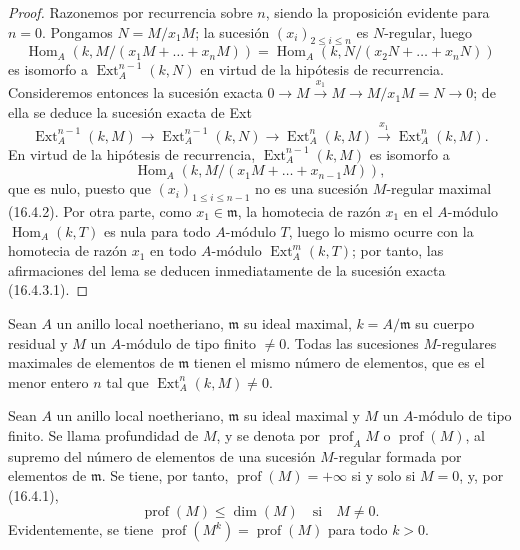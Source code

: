 \begin{proof}
Razonemos por recurrencia sobre $n$, siendo la proposición evidente para
$n=0$. Pongamos $N=M/x_1M$; la sucesión $(x_i)_{2\leq i\leq n}$ es
$N$-regular, luego
\[
  \operatorname{Hom}_A(k,M/(x_1M+\ldots+x_nM))
  =\operatorname{Hom}_A(k,N/(x_2N+\ldots+x_nN))
\]
es isomorfo a $\operatorname{Ext}^{n-1}_A(k,N)$ en virtud de la hipótesis de
recurrencia. Consideremos entonces la sucesión exacta
$0\to M\xrightarrow{x_1}M\to M/x_1M=N\to0$; de ella se deduce la sucesión
exacta de Ext
\begin{equation}
\label{0.16.4.3.1-fr}
\tag{16.4.3.1}
  \operatorname{Ext}^{n-1}_A(k,M)
  \to\operatorname{Ext}^{n-1}_A(k,N)
  \to\operatorname{Ext}^n_A(k,M)
  \xrightarrow{x_1}\operatorname{Ext}^n_A(k,M).
\end{equation}
En virtud de la hipótesis de recurrencia, $\operatorname{Ext}^{n-1}_A(k,M)$
es isomorfo a
\[
  \operatorname{Hom}_A(k,M/(x_1M+\ldots+x_{n-1}M)),
\]
que es nulo, puesto que $(x_i)_{1\leq i\leq n-1}$ no es una sucesión
$M$-regular maximal (16.4.2). Por otra parte, como
$x_1\in\mathfrak{m}$, la homotecia de razón $x_1$ en el $A$-módulo
$\operatorname{Hom}_A(k,T)$ es nula para todo $A$-módulo $T$, luego lo mismo
ocurre con la homotecia de razón $x_1$ en todo $A$-módulo
$\operatorname{Ext}^m_A(k,T)$; por tanto, las afirmaciones del lema se deducen
inmediatamente de la sucesión exacta (16.4.3.1).
\end{proof}

\begin{corollary}[16.4.4]
\label{0.16.4.4-fr}
Sean $A$ un anillo local noetheriano, $\mathfrak{m}$ su ideal maximal,
$k=A/\mathfrak{m}$ su cuerpo residual y $M$ un $A$-módulo de tipo finito
$\neq0$. Todas las sucesiones $M$-regulares maximales de elementos de
$\mathfrak{m}$ tienen el mismo número de elementos, que es el menor entero $n$
tal que $\operatorname{Ext}^n_A(k,M)\neq0$.
\end{corollary}

\begin{definition}[16.4.5]
\label{0.16.4.5-fr}
Sean $A$ un anillo local noetheriano, $\mathfrak{m}$ su ideal maximal y $M$ un
$A$-módulo de tipo finito. Se llama profundidad de $M$, y se denota por
$\operatorname{prof}_A M$ o $\operatorname{prof}(M)$, al supremo del número de
elementos de una sucesión $M$-regular formada por elementos de
$\mathfrak{m}$. Se tiene, por tanto, $\operatorname{prof}(M)=+\infty$ si y
solo si $M=0$, y, por (16.4.1),
\begin{equation}
\label{0.16.4.5.1-fr}
\tag{16.4.5.1}
  \operatorname{prof}(M)\leq\dim(M)\quad\text{si}\quad M\neq0.
\end{equation}
Evidentemente, se tiene $\operatorname{prof}(M^k)=\operatorname{prof}(M)$ para
todo $k>0$.
\end{definition}

